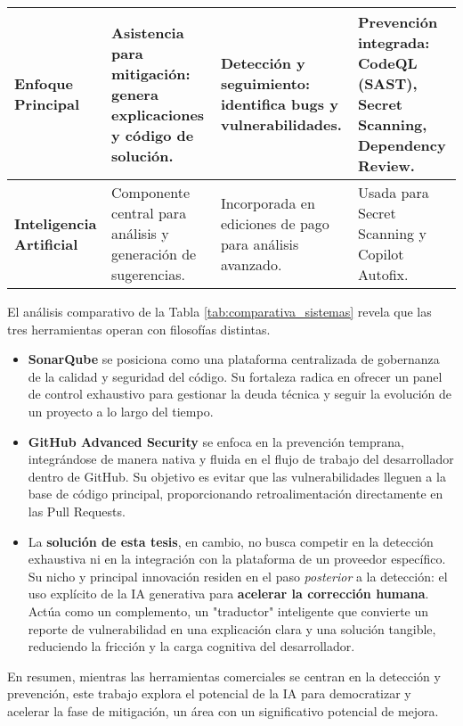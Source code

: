 \begin{table}[h!]
\begin{tabular}{|p{2.6cm}|p{3.9cm}|p{3.9cm}|p{3.9cm}|}
\textbf{Enfoque Principal} & 
\textbf{Asistencia para mitigación}: genera explicaciones y código de solución. & 
\textbf{Detección y seguimiento}: identifica bugs y vulnerabilidades. & 
\textbf{Prevención integrada}: CodeQL (SAST), Secret Scanning, Dependency Review. \\ \hline

\textbf{Inteligencia Artificial} & 
Componente central para análisis y generación de sugerencias. & 
Incorporada en ediciones de pago para análisis avanzado. & 
Usada para Secret Scanning y Copilot Autofix. \\ \hline

\end{tabular}
\end{table}


El análisis comparativo de la Tabla \ref{tab:comparativa_sistemas} revela que las tres herramientas operan con filosofías distintas. 
\begin{itemize}
    \item \textbf{SonarQube} se posiciona como una plataforma centralizada de gobernanza de la calidad y seguridad del código. Su fortaleza radica en ofrecer un panel de control exhaustivo para gestionar la deuda técnica y seguir la evolución de un proyecto a lo largo del tiempo.
    \item \textbf{GitHub Advanced Security} se enfoca en la prevención temprana, integrándose de manera nativa y fluida en el flujo de trabajo del desarrollador dentro de GitHub. Su objetivo es evitar que las vulnerabilidades lleguen a la base de código principal, proporcionando retroalimentación directamente en las Pull Requests.
    \item La \textbf{solución de esta tesis}, en cambio, no busca competir en la detección exhaustiva ni en la integración con la plataforma de un proveedor específico. Su nicho y principal innovación residen en el paso \textit{posterior} a la detección: el uso explícito de la IA generativa para \textbf{acelerar la corrección humana}. Actúa como un complemento, un "traductor" inteligente que convierte un reporte de vulnerabilidad en una explicación clara y una solución tangible, reduciendo la fricción y la carga cognitiva del desarrollador.
\end{itemize}

En resumen, mientras las herramientas comerciales se centran en la detección y prevención, este trabajo explora el potencial de la IA para democratizar y acelerar la fase de mitigación, un área con un significativo potencial de mejora.


